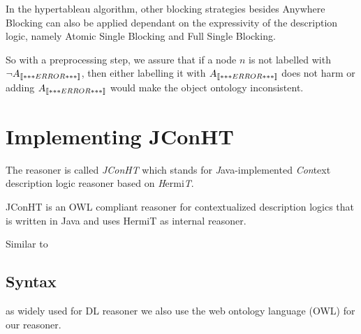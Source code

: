



 



\vspace{3cm}




In the hypertableau algorithm, other blocking strategies besides \textsf{Anywhere Blocking} can also
be applied dependant on the expressivity of the description logic, namely \textsf{Atomic Single
  Blocking} and \textsf{Full Single Blocking.}

\vspace{1cm}

So with a preprocessing step, we assure that if a node $n$ is not labelled with $\lnot
A_{\mathord{\left\llbracket***ERROR***\right\rrbracket}}$, then either labelling it with $A_{\mathord{\left\llbracket***ERROR***\right\rrbracket}}$ does not harm or adding
$A_{\mathord{\left\llbracket***ERROR***\right\rrbracket}}$ would make the object ontology inconsistent.

\section{Implementing JConHT}
\label{sec:implementing-jconht}

The reasoner is called \emph{JConHT} which stands for \emph{J}ava-implemented \emph{Con}text
description logic reasoner based on \emph{H}ermi\emph{T}.

JConHT is an OWL compliant reasoner for contextualized description logics that is written in Java
and uses HermiT as internal reasoner.

Similar to

\clearpage

\subsection{Syntax}
\label{sec:syntax}


as widely used for DL reasoner we also use the web ontology language (OWL) for our reasoner. 

